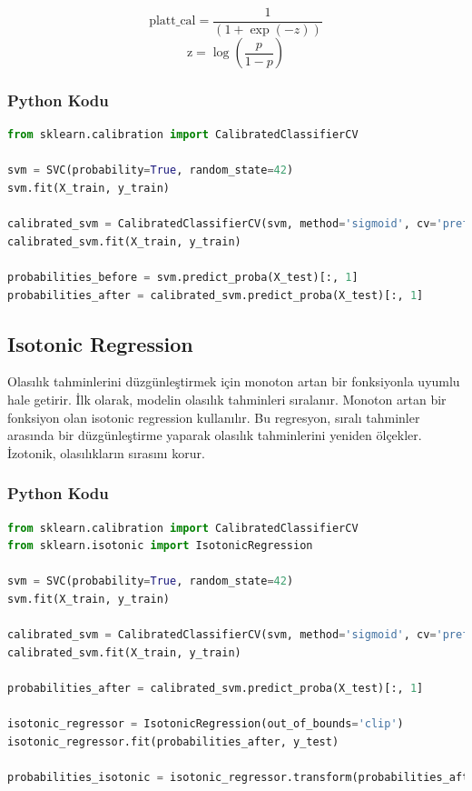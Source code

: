 \[\text{platt\_cal} = \frac{1}{(1 + \exp(-z))}\]
\[\text{z} = \log(\frac{p}{1 - p})\]

\subsubsection{Python Kodu}

\begin{lstlisting}[language=Python, caption=Scikit-learn'de Platt scaling örneği.]
from sklearn.calibration import CalibratedClassifierCV

svm = SVC(probability=True, random_state=42)
svm.fit(X_train, y_train)

calibrated_svm = CalibratedClassifierCV(svm, method='sigmoid', cv='prefit')
calibrated_svm.fit(X_train, y_train)

probabilities_before = svm.predict_proba(X_test)[:, 1]
probabilities_after = calibrated_svm.predict_proba(X_test)[:, 1]
\end{lstlisting}

\newpage

\subsection{Isotonic Regression}
Olasılık tahminlerini düzgünleştirmek için monoton artan bir fonksiyonla uyumlu hale getirir. İlk olarak, modelin olasılık tahminleri sıralanır. Monoton artan bir fonksiyon olan isotonic regression kullanılır. Bu regresyon, sıralı tahminler arasında bir düzgünleştirme yaparak olasılık tahminlerini yeniden ölçekler. İzotonik, olasılıkların sırasını korur.

\subsubsection{Python Kodu}

\begin{lstlisting}[language=Python, caption=Scikit-learn'de Isotonic Regression örneği.]
from sklearn.calibration import CalibratedClassifierCV
from sklearn.isotonic import IsotonicRegression

svm = SVC(probability=True, random_state=42)
svm.fit(X_train, y_train)

calibrated_svm = CalibratedClassifierCV(svm, method='sigmoid', cv='prefit')
calibrated_svm.fit(X_train, y_train)

probabilities_after = calibrated_svm.predict_proba(X_test)[:, 1]

isotonic_regressor = IsotonicRegression(out_of_bounds='clip')
isotonic_regressor.fit(probabilities_after, y_test)

probabilities_isotonic = isotonic_regressor.transform(probabilities_after)
\end{lstlisting}

